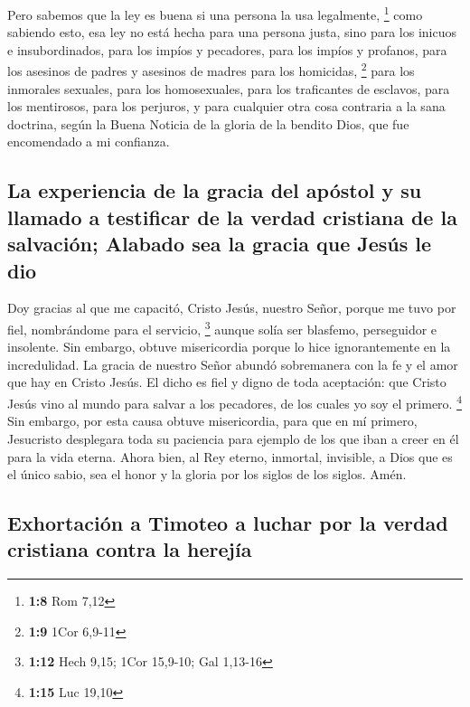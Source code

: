 \begin{paracol}{2}
 Pero sabemos que la ley es buena si una persona la usa
legalmente, \footnote{\textbf{1:8} Rom 7,12}  como
sabiendo esto, esa ley no está hecha para una persona justa, sino para
los inicuos e insubordinados, para los impíos y pecadores, para los
impíos y profanos, para los asesinos de padres y asesinos de madres para
los homicidas, \footnote{\textbf{1:9} 1Cor 6,9-11}  para
los inmorales sexuales, para los homosexuales, para los traficantes de
esclavos, para los mentirosos, para los perjuros, y para cualquier otra
cosa contraria a la sana doctrina,  según la Buena
Noticia de la gloria de la bendito Dios, que fue encomendado a mi
confianza.

\hypertarget{la-experiencia-de-la-gracia-del-apuxf3stol-y-su-llamado-a-testificar-de-la-verdad-cristiana-de-la-salvaciuxf3n-alabado-sea-la-gracia-que-jesuxfas-le-dio}{%
\subsection{La experiencia de la gracia del apóstol y su llamado a
testificar de la verdad cristiana de la salvación; Alabado sea la gracia
que Jesús le
dio}\label{la-experiencia-de-la-gracia-del-apuxf3stol-y-su-llamado-a-testificar-de-la-verdad-cristiana-de-la-salvaciuxf3n-alabado-sea-la-gracia-que-jesuxfas-le-dio}}

 Doy gracias al que me capacitó, Cristo Jesús, nuestro
Señor, porque me tuvo por fiel, nombrándome para el servicio,
\footnote{\textbf{1:12} Hech 9,15; 1Cor 15,9-10; Gal 1,13-16}
 aunque solía ser blasfemo, perseguidor e insolente. Sin
embargo, obtuve misericordia porque lo hice ignorantemente en la
incredulidad.  La gracia de nuestro Señor abundó
sobremanera con la fe y el amor que hay en Cristo Jesús. 
El dicho es fiel y digno de toda aceptación: que Cristo Jesús vino al
mundo para salvar a los pecadores, de los cuales yo soy el primero.
\footnote{\textbf{1:15} Luc 19,10}  Sin embargo, por esta
causa obtuve misericordia, para que en mí primero, Jesucristo desplegara
toda su paciencia para ejemplo de los que iban a creer en él para la
vida eterna.  Ahora bien, al Rey eterno, inmortal,
invisible, a Dios que es el único sabio, sea el honor y la gloria por
los siglos de los siglos. Amén.

\hypertarget{exhortaciuxf3n-a-timoteo-a-luchar-por-la-verdad-cristiana-contra-la-herejuxeda}{%
\subsection{Exhortación a Timoteo a luchar por la verdad cristiana
contra la
herejía}\label{exhortaciuxf3n-a-timoteo-a-luchar-por-la-verdad-cristiana-contra-la-herejuxeda}}


\end{paracol}
